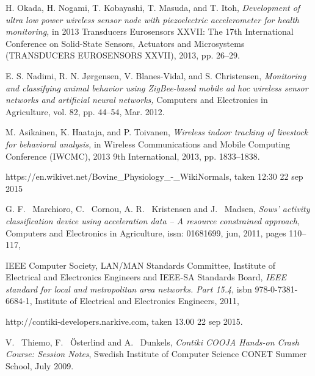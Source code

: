 \documentclass[conference]{IEEEtran}
\begin{document}
\begin{thebibliography}{1}
H. Okada, H. Nogami, T. Kobayashi, T. Masuda, and T. Itoh, \emph{Development of ultra low power wireless sensor node with piezoelectric accelerometer for health monitoring,} in 2013 Transducers Eurosensors XXVII: The 17th International Conference on Solid-State Sensors, Actuators and Microsystems (TRANSDUCERS EUROSENSORS XXVII), 2013, pp. 26–29.

E. S. Nadimi, R. N. Jørgensen, V. Blanes-Vidal, and S. Christensen, \emph{Monitoring and classifying animal behavior using ZigBee-based mobile ad hoc wireless sensor networks and artificial neural networks,} Computers and Electronics in Agriculture, vol. 82, pp. 44–54, Mar. 2012.

M. Asikainen, K. Haataja, and P. Toivanen, \emph{Wireless indoor tracking of livestock for behavioral analysis,} in Wireless Communications and Mobile Computing Conference (IWCMC), 2013 9th International, 2013, pp. 1833–1838.

https://en.wikivet.net/Bovine\_Physiology\_-\_WikiNormals, taken 12:30 22 sep
2015 

G. F. ~Marchioro, C. ~Cornou, A. R. ~Kristensen and J. ~Madsen,
\emph{Sows’ activity classification device using acceleration data – A resource constrained approach},
Computers and Electronics in Agriculture,
issn: 01681699,
jun,
2011,
pages 110--117,

IEEE Computer Society, LAN/MAN Standards Committee, Institute of Electrical
and Electronics Engineers and IEEE-SA Standards Board, \emph{IEEE standard
for local and metropolitan area networks. Part 15.4}, isbn
978-0-7381-6684-1, Institute of Electrical and Electronics Engineers, 2011,

    
http://contiki-developers.narkive.com, taken 13.00 22 sep 2015.

    V. ~Thiemo, F. ~Österlind and A. ~Dunkels, \emph{Contiki COOJA Hands-on
    Crash Course: Session Notes}, Swedish Institute of Computer Science CONET
    Summer School, July 2009.


\end{thebibliography}


\end{document}
